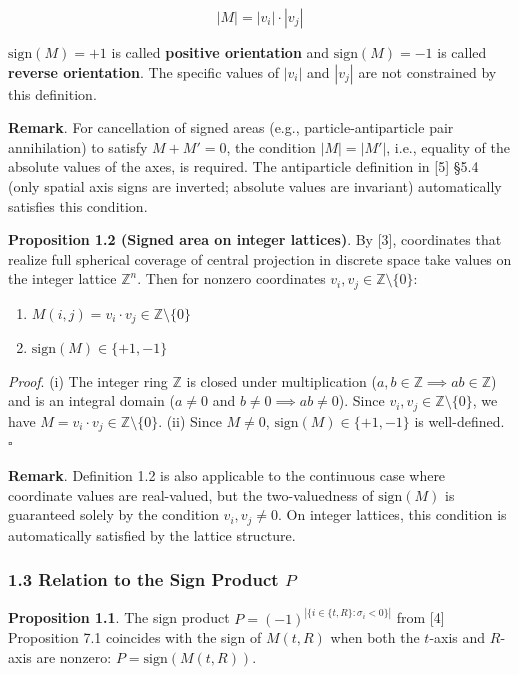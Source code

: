 \documentclass[
  a4paper,11pt]{article}
\begin{document}
\[|M| = |v_i| \cdot |v_j|\]

\(\text{sign}(M) = +1\) is called \textbf{positive orientation} and
\(\text{sign}(M) = -1\) is called \textbf{reverse orientation}. The
specific values of \(|v_i|\) and \(|v_j|\) are not constrained by this
definition.

\textbf{Remark}. For cancellation of signed areas (e.g.,
particle-antiparticle pair annihilation) to satisfy \(M + M' = 0\), the
condition \(|M| = |M'|\), i.e., equality of the absolute values of the
axes, is required. The antiparticle definition in {[}5{]} §5.4 (only
spatial axis signs are inverted; absolute values are invariant)
automatically satisfies this condition.

\textbf{Proposition 1.2 (Signed area on integer lattices)}. By {[}3{]},
coordinates that realize full spherical coverage of central projection
in discrete space take values on the integer lattice \(\mathbb{Z}^n\).
Then for nonzero coordinates
\(v_i, v_j \in \mathbb{Z} \setminus \{0\}\):

\begin{enumerate}
\def\labelenumi{(\roman{enumi})}
\item
  \(M(i,j) = v_i \cdot v_j \in \mathbb{Z} \setminus \{0\}\)
\item
  \(\text{sign}(M) \in \{+1, -1\}\)
\end{enumerate}

\emph{Proof}. (i) The integer ring \(\mathbb{Z}\) is closed under
multiplication (\(a, b \in \mathbb{Z} \implies ab \in \mathbb{Z}\)) and
is an integral domain (\(a \neq 0\) and
\(b \neq 0 \implies ab \neq 0\)). Since
\(v_i, v_j \in \mathbb{Z} \setminus \{0\}\), we have
\(M = v_i \cdot v_j \in \mathbb{Z} \setminus \{0\}\). (ii) Since
\(M \neq 0\), \(\text{sign}(M) \in \{+1, -1\}\) is well-defined.
\(\square\)

\textbf{Remark}. Definition 1.2 is also applicable to the continuous
case where coordinate values are real-valued, but the two-valuedness of
\(\text{sign}(M)\) is guaranteed solely by the condition
\(v_i, v_j \neq 0\). On integer lattices, this condition is
automatically satisfied by the lattice structure.

\subsubsection{\texorpdfstring{1.3 Relation to the Sign Product
\(P\)}{1.3 Relation to the Sign Product P}}\label{relation-to-the-sign-product-p}

\textbf{Proposition 1.1}. The sign product
\(P = (-1)^{|\{i \in \{t, R\} : \sigma_i < 0\}|}\) from {[}4{]}
Proposition 7.1 coincides with the sign of \(M(t, R)\) when both the
\(t\)-axis and \(R\)-axis are nonzero: \(P = \text{sign}(M(t, R))\).
\end{document}
